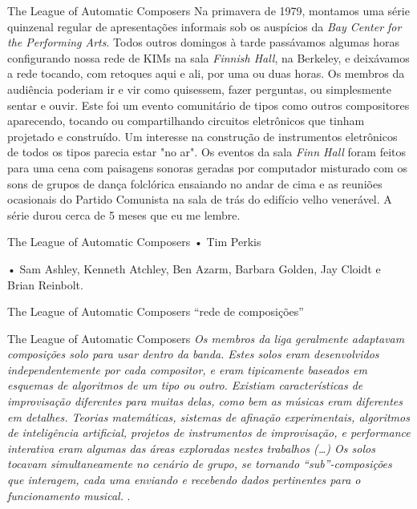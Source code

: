 \documentclass[aspectratio=169]{beamer}
\begin{document}
\begin{frame}{The League of Automatic Composers}
Na primavera de 1979, montamos uma série quinzenal regular de apresentações informais sob os auspícios da \emph{Bay Center for the Performing Arts}. Todos outros domingos à tarde passávamos algumas horas configurando nossa rede de KIMs na sala \emph{Finnish Hall}, na Berkeley, e deixávamos a rede tocando, com retoques aqui e ali, por uma ou duas horas. Os membros da audiência poderiam ir e vir como quisessem, fazer perguntas, ou simplesmente sentar e ouvir. Este foi um evento comunitário de tipos como outros compositores aparecendo, tocando ou compartilhando circuitos eletrônicos que tinham projetado e construído. Um interesse na construção de instrumentos eletrônicos de todos os tipos parecia estar "no ar". Os eventos da sala \emph{Finn Hall} foram feitos para uma cena com paisagens sonoras geradas por computador misturado com os sons de grupos de dança folclórica ensaiando no andar de cima e as reuniões ocasionais do Partido Comunista na sala de trás do edifício velho venerável. A série durou cerca de 5 meses que eu me lembre.\cite{brown_indigenous_2013}
\end{frame}

\begin{frame}{The League of Automatic Composers}
• Tim Perkis

• Sam Ashley, Kenneth Atchley, Ben Azarm, Barbara Golden, Jay Cloidt e Brian Reinbolt.
\end{frame}

\begin{frame}{The League of Automatic Composers}
``rede de composições''
\end{frame}

\begin{frame}{The League of Automatic Composers}
\emph{Os membros da liga geralmente adaptavam composições solo para usar dentro da banda. Estes solos eram desenvolvidos independentemente por cada compositor, e eram tipicamente baseados em esquemas de algoritmos de um tipo ou outro. Existiam características de improvisação diferentes para muitas delas, como bem as músicas eram diferentes em detalhes. Teorias matemáticas, sistemas de afinação experimentais, algoritmos de inteligência artificial, projetos de instrumentos de improvisação, e performance interativa eram algumas das áreas exploradas nestes trabalhos (\ldots) Os solos tocavam simultaneamente no cenário de grupo, se tornando ``sub''-composições que interagem, cada uma enviando e recebendo dados pertinentes para o funcionamento musical.}  \cite[12$^o$ parágrafo]{brown_indigenous_2013}.
\end{frame}
\end{document}
